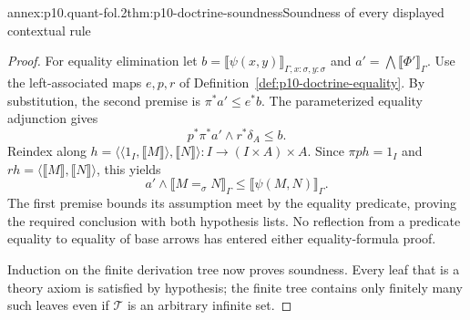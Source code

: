 \begin{annexitem}{annex:p10.quant-fol.2}{thm:p10-doctrine-soundness}{Soundness of every displayed contextual rule}
\begin{proof}
For equality elimination let
\(b=\llbracket\psi(x,y)\rrbracket_{\Gamma,x:\sigma,y:\sigma}\)
and \(a'=\bigwedge\llbracket\Phi'\rrbracket_\Gamma\).
Use the left-associated maps \(e,p,r\) of
Definition~\ref{def:p10-doctrine-equality}.
By substitution, the second premise is \(\pi^*a'\leq e^*b\).
The parameterized equality adjunction gives
\[
                   p^*\pi^*a'\wedge r^*\delta_A\leq b.
\]
Reindex along
\(h=\langle\langle1_I,\llbracket M\rrbracket\rangle,
                         \llbracket N\rrbracket\rangle:I\to(I\times A)\times A\).
Since \(\pi p h=1_I\) and
\(r h=\langle\llbracket M\rrbracket,\llbracket N\rrbracket\rangle\),
this yields
\[
 a'\wedge\llbracket M=_\sigma N\rrbracket_\Gamma
                      \leq\llbracket\psi(M,N)\rrbracket_\Gamma.
\]
The first premise bounds its assumption meet by the equality
predicate, proving the required conclusion with both hypothesis lists.
No reflection from a predicate equality to equality of base arrows
has entered either equality-formula proof.

Induction on the finite derivation tree now proves soundness.
Every leaf that is a theory axiom is satisfied by hypothesis; the
finite tree contains only finitely many such leaves even if
\(\mathcal T\) is an arbitrary infinite set.
\end{proof}
\end{annexitem}

